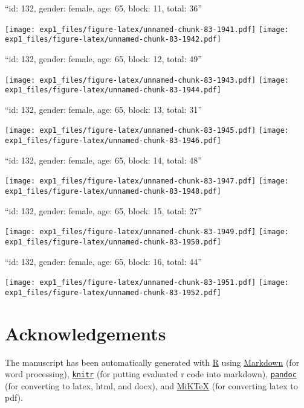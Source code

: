 \documentclass[11pt,,]{article}
\begin{document}
\newpage
[1] 

``id: 132, gender: female, age: 65, block: 11, total: 36''

\texttt{[image: exp1\_files/figure-latex/unnamed-chunk-83-1941.pdf]}
\texttt{[image: exp1\_files/figure-latex/unnamed-chunk-83-1942.pdf]}

\newpage
[1] 

``id: 132, gender: female, age: 65, block: 12, total: 49''

\texttt{[image: exp1\_files/figure-latex/unnamed-chunk-83-1943.pdf]}
\texttt{[image: exp1\_files/figure-latex/unnamed-chunk-83-1944.pdf]}

\newpage
[1] 

``id: 132, gender: female, age: 65, block: 13, total: 31''

\texttt{[image: exp1\_files/figure-latex/unnamed-chunk-83-1945.pdf]}
\texttt{[image: exp1\_files/figure-latex/unnamed-chunk-83-1946.pdf]}

\newpage
[1] 

``id: 132, gender: female, age: 65, block: 14, total: 48''

\texttt{[image: exp1\_files/figure-latex/unnamed-chunk-83-1947.pdf]}
\texttt{[image: exp1\_files/figure-latex/unnamed-chunk-83-1948.pdf]}

\newpage
[1] 

``id: 132, gender: female, age: 65, block: 15, total: 27''

\texttt{[image: exp1\_files/figure-latex/unnamed-chunk-83-1949.pdf]}
\texttt{[image: exp1\_files/figure-latex/unnamed-chunk-83-1950.pdf]}

\newpage
[1] 

``id: 132, gender: female, age: 65, block: 16, total: 44''

\texttt{[image: exp1\_files/figure-latex/unnamed-chunk-83-1951.pdf]}
\texttt{[image: exp1\_files/figure-latex/unnamed-chunk-83-1952.pdf]}

\newpage

\section{Acknowledgements}\label{acknowledgements}

The manuscript has been automatically generated with
\href{http://r-project.org/}{R} using
\href{http://daringfireball.net/projects/markdown/}{Markdown} (for word
processing), \href{http://yihui.name/knitr/}{\texttt{knitr}} (for
putting evaluated r code into markdown),
\href{http://johnmacfarlane.net/pandoc/}{\texttt{pandoc}} (for
converting to latex, html, and docx), and
\href{http://miktex.org/}{MiKTeX} (for converting latex to pdf).
\end{document}
